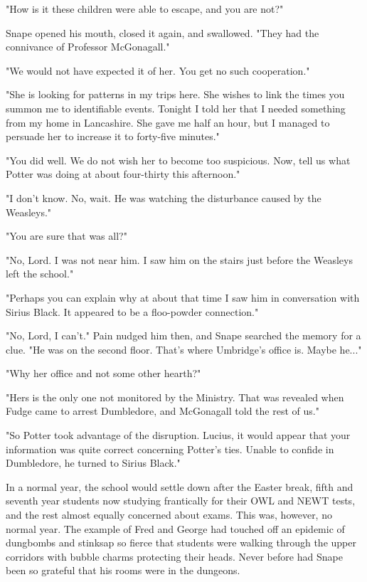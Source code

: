 "How is it these children were able to escape, and you are not?"

Snape opened his mouth, closed it again, and swallowed. "They had the connivance of Professor McGonagall."

"We would not have expected it of her. You get no such cooperation."

"She is looking for patterns in my trips here. She wishes to link the times you summon me to identifiable events. Tonight I told her that I needed something from my home in Lancashire. She gave me half an hour, but I managed to persuade her to increase it to forty-five minutes."

"You did well. We do not wish her to become too suspicious. Now, tell us what Potter was doing at about four-thirty this afternoon."

"I don't know. No, wait. He was watching the disturbance caused by the Weasleys."

"You are sure that was all?"

"No, Lord. I was not near him. I saw him on the stairs just before the Weasleys left the school."

"Perhaps you can explain why at about that time I saw him in conversation with Sirius Black. It appeared to be a floo-powder connection."

"No, Lord, I can't." Pain nudged him then, and Snape searched the memory for a clue. "He was on the second floor. That's where Umbridge's office is. Maybe he..."

"Why her office and not some other hearth?"

"Hers is the only one not monitored by the Ministry. That was revealed when Fudge came to arrest Dumbledore, and McGonagall told the rest of us."

"So Potter took advantage of the disruption. Lucius, it would appear that your information was quite correct concerning Potter's ties. Unable to confide in Dumbledore, he turned to Sirius Black."

\sbreak

In a normal year, the school would settle down after the Easter break, fifth and seventh year students now studying frantically for their OWL and NEWT tests, and the rest almost equally concerned about exams. This was, however, no normal year. The example of Fred and George had touched off an epidemic of dungbombs and stinksap so fierce that students were walking through the upper corridors with bubble charms protecting their heads. Never before had Snape been so grateful that his rooms were in the dungeons.

